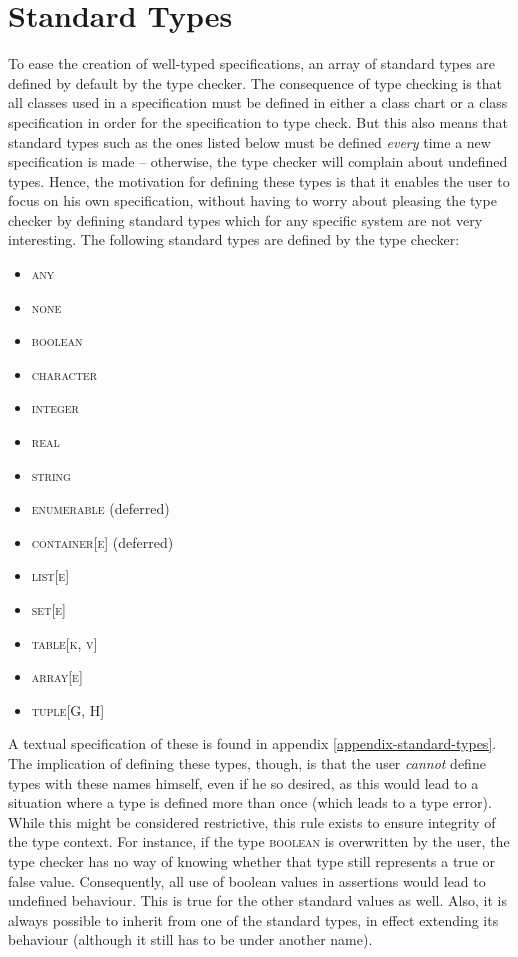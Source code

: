 \section{Standard Types}
\label{implementation-standard-types}
To ease the creation of well-typed specifications, an array of standard types are defined by default by the type checker. The consequence of type checking is that all classes used in a specification must be defined in either a class chart or a class specification in order for the specification to type check. But this also means that standard types such as the ones listed below must be defined \emph{every} time a new specification is made -- otherwise, the type checker will complain about undefined types. Hence, the motivation for defining these types is that it enables the user to focus on his own specification, without having to worry about pleasing the type checker by defining standard types which for any specific system are not very interesting. The following standard types are defined by the type checker:
\begin{itemize}
\item \textsc{any}
\item \textsc{none}
\item \textsc{boolean}
\item \textsc{character}
\item \textsc{integer}
\item \textsc{real}
\item \textsc{string}
\item \textsc{enumerable} (deferred)
\item \textsc{container}[\textsc{e}] (deferred)
\item \textsc{list}[\textsc{e}]
\item \textsc{set}[\textsc{e}]
\item \textsc{table}[\textsc{k}, \textsc{v}]
\item \textsc{array}[\textsc{e}]
\item \textsc{tuple}[\textsc{G}, \textsc{H}]
\end{itemize}
A textual \bon{} specification of these is found in appendix \ref{appendix-standard-types}. The implication of defining these types, though, is that the user \emph{cannot} define types with these names himself, even if he so desired, as this would lead to a situation where a type is defined more than once (which leads to a type error). While this might be considered restrictive, this rule exists to ensure integrity of the type context. For instance, if the type \textsc{boolean} is overwritten by the user, the type checker has no way of knowing whether that type still represents a true or false value. Consequently, all use of boolean values in assertions would lead to undefined behaviour. This is true for the other standard values as well. Also, it is always possible to inherit from one of the standard types, in effect extending its behaviour (although it still has to be under another name).
